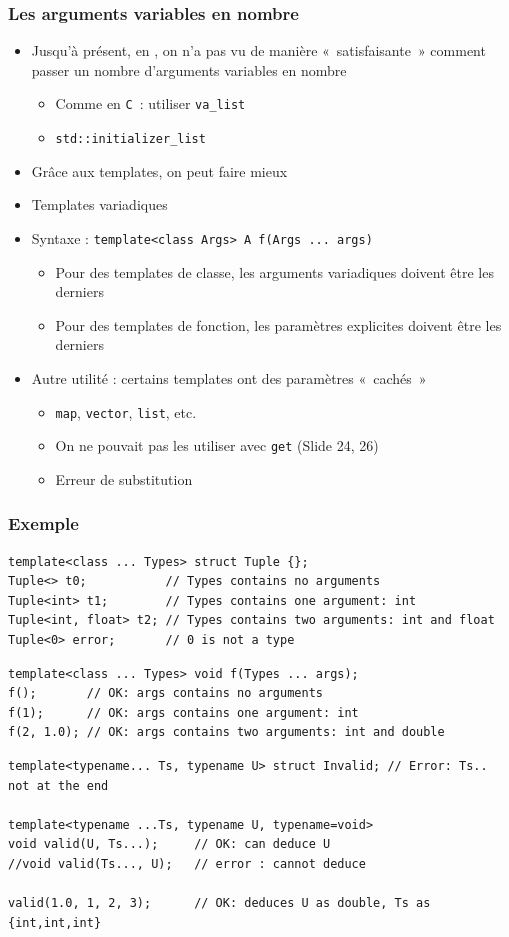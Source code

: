 \begin{frame}
\frametitle{Les arguments variables en nombre}
\begin{itemize}[<+->]
\item Jusqu'à présent, en \cpp, on n'a pas vu de manière «~satisfaisante~» comment passer un nombre d'arguments variables en nombre
	\begin{itemize}
	\item Comme en \texttt{C}~: utiliser \texttt{va\_list}
	\item \texttt{std::initializer\_list}
	\end{itemize}
\item Grâce aux templates, on peut faire mieux
\item Templates variadiques
\item Syntaxe : \lstinline|template<class Args> A f(Args ... args)|
	\begin{itemize}
	\item Pour des templates de classe, les arguments variadiques doivent être les derniers
	\item Pour des templates de fonction, les paramètres explicites doivent être les derniers
	\end{itemize}
\item Autre utilité : certains templates ont des paramètres «~cachés~»
\begin{itemize}
	\item \texttt{map}, \texttt{vector}, \texttt{list}, etc.
	\item On ne pouvait pas les utiliser avec \texttt{get} (Slide 24, 26)
	\item Erreur de substitution
\end{itemize}
\end{itemize}
\end{frame}

\begin{frame}[containsverbatim]
\frametitle{Exemple}
\begin{lstlisting}
template<class ... Types> struct Tuple {};
Tuple<> t0;           // Types contains no arguments
Tuple<int> t1;        // Types contains one argument: int
Tuple<int, float> t2; // Types contains two arguments: int and float
Tuple<0> error;       // 0 is not a type
\end{lstlisting}
\begin{lstlisting}
template<class ... Types> void f(Types ... args);
f();       // OK: args contains no arguments
f(1);      // OK: args contains one argument: int
f(2, 1.0); // OK: args contains two arguments: int and double
\end{lstlisting}
\begin{lstlisting}
template<typename... Ts, typename U> struct Invalid; // Error: Ts.. not at the end
 
template<typename ...Ts, typename U, typename=void>
void valid(U, Ts...);     // OK: can deduce U
//void valid(Ts..., U);   // error : cannot deduce
 
valid(1.0, 1, 2, 3);      // OK: deduces U as double, Ts as {int,int,int}
\end{lstlisting}
\end{frame}

